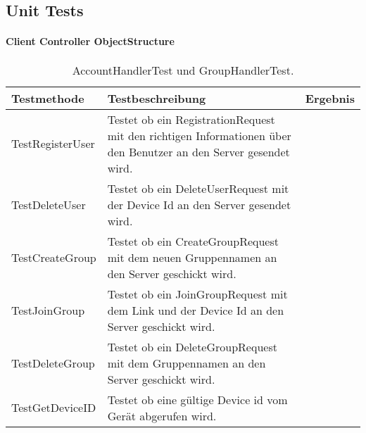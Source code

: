 \subsection{Unit Tests}
	\paragraph{Client Controller ObjectStructure}
	\begin{table}[H]
		{
			\begin{tabular}{|p{}|p{}|>{\centering}p{}|}
				\hline
				Testmethode & Testbeschreibung & Ergebnis\tabularnewline
				\hline
				\hspace{0pt}TestRegisterUser & Testet ob ein RegistrationRequest mit den richtigen Informationen über den Benutzer an den Server gesendet wird. &			\checkmark\tabularnewline
				\hspace{0pt}TestDeleteUser & Testet ob ein DeleteUserRequest mit der Device Id an den Server gesendet wird. & \checkmark\tabularnewline		
				\hspace{0pt}TestCreateGroup & Testet ob ein CreateGroupRequest mit dem neuen Gruppennamen an den Server geschickt wird. & \checkmark\tabularnewline
				\hspace{0pt}TestJoinGroup & Testet ob ein JoinGroupRequest mit dem Link und der Device Id an den Server geschickt wird. & \checkmark\tabularnewline
				\hspace{0pt}TestDeleteGroup & Testet ob ein DeleteGroupRequest mit dem Gruppennamen an den Server geschickt wird. & \checkmark\tabularnewline
				\hspace{0pt}TestGetDeviceID & Testet ob eine gültige Device id vom Gerät abgerufen wird. & \checkmark\tabularnewline
				\hline
			\end{tabular}}
		\caption{AccountHandlerTest und GroupHandlerTest.}
	\end{table}
	
